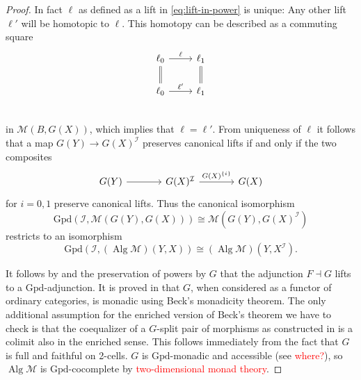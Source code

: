 \documentclass{article}
\newcommand{\todo}[1]{\textcolor{red}{#1}}
\theoremstyle{remark}
\theoremstyle{definition}
\begin{document}
\begin{proof}
  In fact $\ell$ as defined as a lift in \eqref{eq:lift-in-power} is unique:
  Any other lift $\ell'$ will be homotopic to $\ell$.
  This homotopy can be described as a commuting square
  \begin{equation}
    \begin{tikzcd}
      \ell_0 \arrow[r, "\ell"] \arrow[d, equals] & \ell_1 \arrow[d, equals] \\
      \ell_0 \arrow[r, "\ell'"] & \ell_1 \\
    \end{tikzcd}
  \end{equation}
  in $\mathcal{M}(B, G(X))$, which implies that $\ell = \ell'$.
  From uniqueness of $\ell$ it follows that a map $G(Y) \rightarrow G(X)^\mathcal{I}$ preserves canonical lifts if and only if the two composites
  \begin{equation}
    \begin{tikzcd}[column sep=large]
      G(Y) \arrow[r] & G(X)^\mathcal{I} \arrow[r, "G(X)^{\{i\}}"] & G(X)
    \end{tikzcd}
  \end{equation}
  for $i = 0, 1$ preserve canonical lifts.
  Thus the canonical isomorphism
  \begin{equation}
    \mathrm{Gpd}(\mathcal{I}, \mathcal{M}(G(Y), G(X))) \cong \mathcal{M}(G(Y), G(X)^\mathcal{I})
  \end{equation}
  restricts to an isomorphism
  \begin{equation}
    \mathrm{Gpd}(\mathcal{I}, (\operatorname{Alg} \mathcal{M})(Y, X)) \cong (\operatorname{Alg} \mathcal{M})(Y, X^\mathcal{I}).
  \end{equation}

  It follows by \cite[theorem 4.85]{basic-concepts-of-enriched-category-theory} and the preservation of powers by $G$ that the adjunction $F \dashv G$ lifts to a $\mathrm{Gpd}$-adjunction.
  It is proved in \cite{algebraic-models} that $G$, when considered as a functor of ordinary categories, is monadic using Beck's monadicity theorem.
  The only additional assumption for the enriched version of Beck's theorem \cite[theorem II.2.1]{enriched-kan-extensions} we have to check is that the coequalizer of a $G$-split pair of morphisms as constructed in \cite{algebraic-models} is a colimit also in the enriched sense.
  This follows immediately from the fact that $G$ is full and faithful on 2-cells.
  $G$ is $\mathrm{Gpd}$-monadic and accessible (see \todo{where?}), so $\operatorname{Alg} \mathcal{M}$ is $\mathrm{Gpd}$-cocomplete by \todo{two-dimensional monad theory}.


\end{proof}
\end{document}
